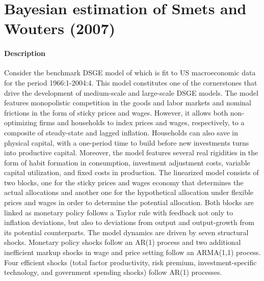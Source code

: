 \documentclass{article}
\begin{document}
\newpage 

\section[Bayesian estimation of Smets and Wouters (2007)]{Bayesian estimation of Smets and Wouters (2007)\label{ex:SW2007RWMH}}
\paragraph{Description}
Consider the benchmark DSGE model of \textcite{Smets.Wouters_2007_ShocksFrictionsUS} which is fit to US macroeconomic data for the period 1966:1-2004:4.
This model constitutes one of the cornerstones that drive the development of medium-scale and large-scale DSGE models.
The model features monopolistic competition in the goods and labor markets and nominal frictions in the form of sticky prices and wages.
However, it allows both non-optimizing firms and households to index prices and wages, respectively, to a composite of steady-state and lagged inflation.
Households can also save in physical capital, with a one-period time to build before new investments turns into productive capital.
Moreover, the model features several real rigidities in the form of habit formation in consumption, investment adjustment costs, variable capital utilization, and fixed costs in production.
The linearized model consists of two blocks, one for the sticky prices and wages economy that determines the actual allocations
  and another one for the hypothetical allocation under flexible prices and wages in order to determine the potential allocation.
Both blocks are linked as monetary policy follows a Taylor rule with feedback not only to inflation deviations,
  but also to deviations from output and output-growth from its potential counterparts.
The model dynamics are driven by seven structural shocks.
Monetary policy shocks follow an AR(1) process and two additional inefficient markup shocks in wage and price setting follow an ARMA(1,1) process.
Four efficient shocks (total factor productivity, risk premium, investment-specific technology, and government spending shocks) follow AR(1) processes.
\end{document}
